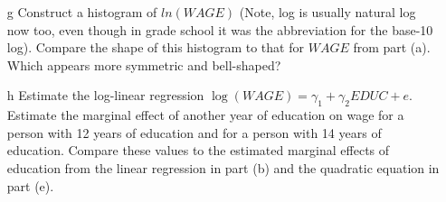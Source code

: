 \documentclass[xcolor={dvipsnames}]{beamer}
\begin{document}
\begin{frame}
\begin{itemize}[<+->]

	\item[g]
	Construct a histogram of $ln(WAGE)$ (Note, log is usually natural log now too, even though in grade school it was the abbreviation for the base-10 log). Compare the shape of this histogram to that for $WAGE$ from part (a). Which appears more symmetric and bell-shaped?
	
	\item[h]
	Estimate the log-linear regression $\log(WAGE) = \gamma_1 + \gamma_2 EDUC + e$. Estimate the marginal effect of another year of education on wage for a person with 12 years of education and for a person with 14 years of education. Compare these values to the estimated marginal effects of education from the linear regression in part (b) and the quadratic equation in part (e).
\end{itemize}
\end{frame}
\end{document}
